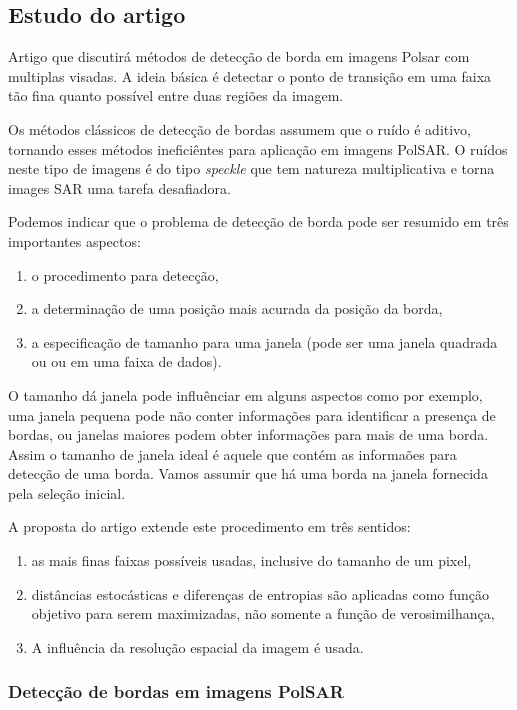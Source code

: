 \documentclass[12pt,a4paper]{article}
\begin{document}
\subsection{Estudo do artigo  \cite{nasc_frery_2014}}

Artigo que discutirá métodos de detecção de borda em imagens Polsar com multiplas visadas. A ideia básica é detectar o ponto de transição em uma faixa tão fina quanto possível entre duas regiões da imagem.

Os métodos clássicos de detecção de bordas assumem que o ruído é aditivo, tornando esses métodos ineficiêntes para aplicação em imagens PolSAR. O ruídos neste tipo de imagens é do tipo {\it speckle} que tem natureza multiplicativa e torna images SAR uma tarefa desafiadora.

Podemos indicar que o problema de detecção de borda pode ser resumido em três importantes aspectos:
\begin{enumerate}
	\item o procedimento para detecção,
	\item a determinação de uma posição mais acurada da posição da borda,
	\item a especificação de tamanho para uma janela (pode ser uma janela quadrada ou ou em uma faixa de dados). 
\end{enumerate}

O tamanho dá janela pode influênciar em alguns aspectos como por exemplo, uma janela pequena pode não conter informações para identificar a presença de bordas, ou janelas maiores podem obter informações para mais de uma borda. Assim o tamanho de janela ideal é aquele que contém as informaões para detecção de uma borda. Vamos assumir que há uma borda na janela fornecida pela seleção inicial.

A proposta do artigo extende este procedimento em três sentidos:
\begin{enumerate}
	\item as mais finas faixas possíveis usadas, inclusive do tamanho de um pixel,
	\item distâncias estocásticas e diferenças de entropias são aplicadas como função objetivo para serem maximizadas, não somente a função de verosimilhança,
	\item A influência da resolução espacial da imagem é usada. 
\end{enumerate}

\subsubsection{Detecção de bordas em imagens PolSAR}
\end{document}
